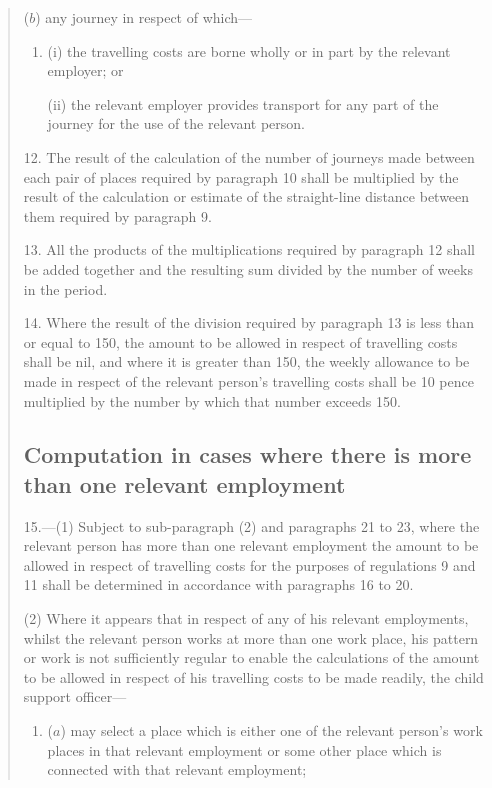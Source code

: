 \documentclass[a4paper]{article}
\begin{document}
\begin{quotation}
\begin{enumerate}
($b$) any journey in respect of which—
\begin{enumerate}\item[]
(i) the travelling costs are borne wholly or in part by the relevant employer; or

(ii) the relevant employer provides transport for any part of the journey for the use of the relevant person.
\end{enumerate}
\end{enumerate}

\medskip

12.  The result of the calculation of the number of journeys made between each pair of places required by paragraph 10 shall be multiplied by the result of the calculation or estimate of the straight-line distance between them required by paragraph 9.

\medskip

13.  All the products of the multiplications required by paragraph 12 shall be added together and the resulting sum divided by the number of weeks in the period.

\medskip

14.  Where the result of the division required by paragraph 13 is less than or equal to 150, the amount to be allowed in respect of travelling costs shall be nil, and where it is greater than 150, the weekly allowance to be made in respect of the relevant person’s travelling costs shall be 10 pence multiplied by the number by which that number exceeds 150.

\subsection*{Computation in cases where there is more than one relevant employment}

15.—(1) Subject to sub-paragraph (2) and paragraphs 21 to 23, where the relevant person has more than one relevant employment the amount to be allowed in respect of travelling costs for the purposes of regulations 9 and 11 shall be determined in accordance with paragraphs 16 to 20.

(2) Where it appears that in respect of any of his relevant employments, whilst the relevant person works at more than one work place, his pattern or work is not sufficiently regular to enable the calculations of the amount to be allowed in respect of his travelling costs to be made readily, the child support officer—
\begin{enumerate}\item[]
($a$) may select a place which is either one of the relevant person’s work places in that relevant employment or some other place which is connected with that relevant employment;


\end{enumerate}
\end{quotation}
\end{document}
